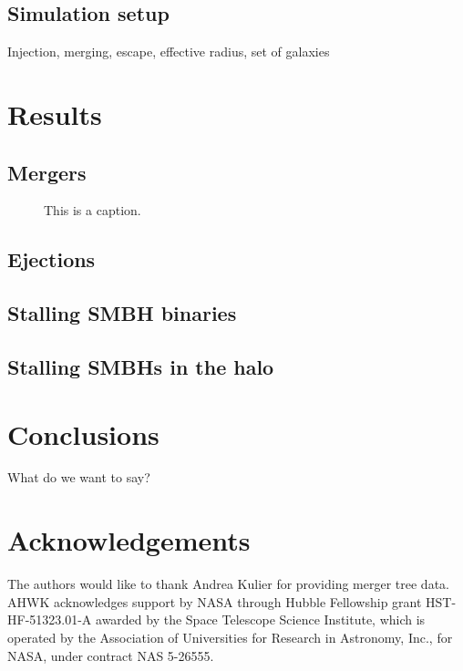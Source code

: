 \documentclass[english, apj]{emulateapj}
\begin{document}
\subsection{Simulation setup}
Injection, merging, escape, effective radius, set of galaxies


\section{Results}\label{sec:results}

\subsection{Mergers}

\begin{figure}
\centering
\caption{This is a caption.}
\label{this_is_a_label}
\end{figure}

\subsection{Ejections}

\subsection{Stalling SMBH binaries}

\subsection{Stalling SMBHs in the halo}





\section{Conclusions}\label{sec:conclusions}
What do we want to say?



\section*{Acknowledgements}

The authors would like to thank Andrea Kulier for providing merger tree data. AHWK acknowledges support by NASA through Hubble Fellowship grant HST-HF-51323.01-A awarded by the Space Telescope Science Institute, which is operated by the Association of Universities for Research in Astronomy, Inc., for NASA, under contract NAS 5-26555. 








\end{document}
